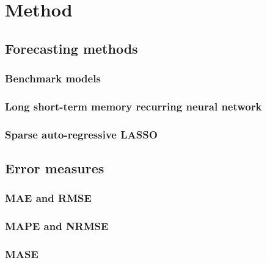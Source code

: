 
\section{Method}\label{Sec:Method}




\subsection{Forecasting methods}\label{Sec:Method;Subsec:Forecast}



\subsubsection{Benchmark models}



\subsubsection{Long short-term memory recurring neural network}



\subsubsection{Sparse auto-regressive LASSO}




\subsection{Error measures}\label{Sec:Method;Subsec:Error}



\subsubsection{MAE and RMSE}


\subsubsection{MAPE and NRMSE}



\subsubsection{MASE}



